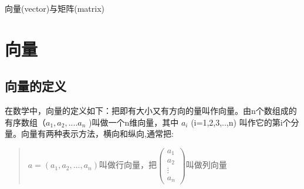 \documentclass[a4paper,10pt]{article}
\begin{document}
\begin{CJK}{UTF8}{song}
\begin{center}
\Large 向量(vector)与矩阵(matrix)
\end{center}
\section{向量}
\subsection{向量的定义}
在数学中，向量的定义如下：把即有大小又有方向的量叫作向量。由n个数组成的有序数组（$a_{1},a_{2},....a_{n}$ )叫做一个n维向量，其中 $a_i$ (i=1,2,3,..,n) 叫作它的第i个分量。向量有两种表示方法，横向和纵向,通常把:
\begin{quote}
$a=(a_1,a_2,...,a_n)$叫做行向量，把$\left( \begin{array}{c} a_1 \\ a_2 \\ \vdots{} \\ a_n \end{array} \right)$叫做列向量
\end{quote}

\end{CJK}
\end{document}
